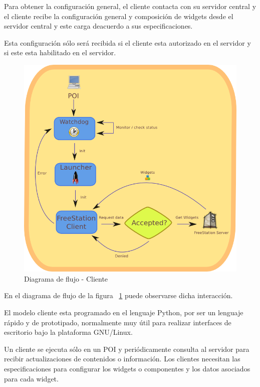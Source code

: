 \newpage

Para obtener la configuración general, el cliente contacta con su servidor
central y el cliente recibe la configuración general y composición de widgets
desde el servidor central y este carga deacuerdo a sus especificaciones.

Esta configuración sólo será recibida si el cliente esta autorizado en el
servidor y si este esta habilitado en el servidor.

\begin{figure}[hb]
    \begin{center}
        \includegraphics[scale=0.8]{src/img/client-flow-diagram.png}
        \caption[Diagrama de flujo - Cliente] {Diagrama de flujo - Cliente}
        \label{fig:flowclient}
    \end{center}
\end{figure}

En el diagrama de flujo de la figura ~\ref{fig:flowclient} puede observarse
dicha interacción.

\newpage
El modelo cliente esta programado en el lenguaje Python, por ser un lenguaje
rápido y de prototipado, normalmente muy útil para realizar interfaces de
escritorio bajo la plataforma GNU/Linux.

Un cliente se ejecuta sólo en un \acs{POI}\label{acro:POI} y periódicamente
consulta al servidor para recibir actualizaciones de contenidos o información. Los
clientes necesitan las especificaciones para configurar los widgets o
componentes y los datos asociados para cada widget.

